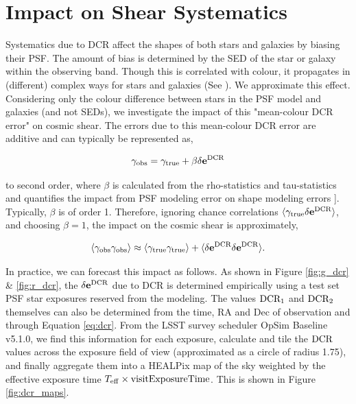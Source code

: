 \section{Impact on Shear Systematics}

Systematics due to DCR affect the shapes of both stars and galaxies by biasing their PSF. 
The amount of bias is determined by the SED of the star or galaxy within the observing band.
Though this is correlated with colour, it propagates in (different) complex ways for stars and galaxies (See \citealt{meyersburchat15}).
We approximate this effect.
Considering only the colour difference between stars in the PSF model and galaxies (and not SEDs), we investigate the impact of this "mean-colour DCR error" on cosmic shear.
The errors due to this mean-colour DCR error are additive and can typically be represented as,

\begin{equation*}
    \gamma_{\rm obs} = \gamma_{\rm true}  + \beta \delta\mathbf{e}^{\rm DCR}
\end{equation*}

to second order, where $\beta$ is calculated from the rho-statistics and tau-statistics and quantifies the impact from PSF modeling error on shape modeling errors \cite[E.g.][]{gatti2021}]. Typically, $\beta$ is of order 1. Therefore, ignoring chance correlations $\langle \gamma_{\rm true} \delta\mathbf{e}^{\rm DCR}\rangle$, and choosing $\beta = 1$, the impact on the cosmic shear is approximately,

\begin{equation*}
    \langle \gamma_{\rm obs}\gamma_{\rm obs} \rangle \approx \langle \gamma_{\rm true}\gamma_{\rm true} \rangle  + \langle \delta\mathbf{e}^{\rm DCR} \delta\mathbf{e}^{\rm DCR}\rangle.
\end{equation*}

In practice, we can forecast this impact as follows.
As shown in Figure \ref{fig:g_dcr} \& \ref{fig:r_dcr}, the $\delta\mathbf{e}^{\rm DCR}$ due to DCR is determined empirically using a test set PSF star exposures reserved from the modeling. 
The values $\rm DCR_1$ and $\rm DCR_2$ themselves can also be determined from the time, RA and Dec of observation and through Equation \ref{eq:dcr}. 
From the LSST survey scheduler OpSim Baseline v5.1.0, we find this information for each exposure, calculate and tile the $\rm DCR$ values across the exposure field of view (approximated as a circle of radius 1.75\textdegree), and finally aggregate them into a HEALPix map of the sky weighted by the effective exposure time $T_{\rm eff}\times \rm visitExposureTime$.
This is shown in Figure \ref{fig:dcr_maps}.

